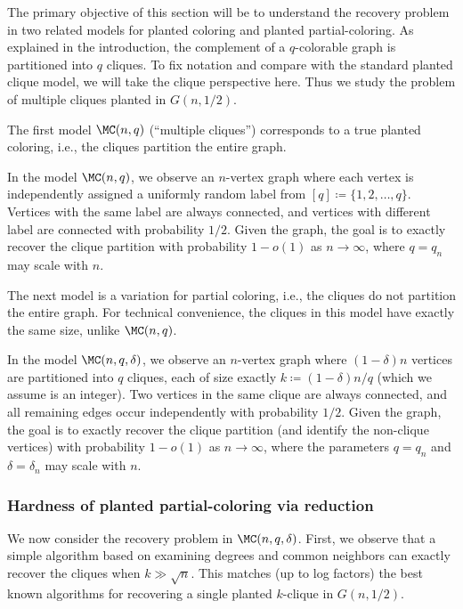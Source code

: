 \documentclass{article}
\begin{document}
The primary objective of this section will be to understand the recovery problem in two related models for planted coloring and planted partial-coloring. As explained in the introduction, the complement of a $q$-colorable graph is partitioned into $q$ cliques. To fix notation and compare with the standard planted clique model, we will take the clique perspective here. Thus we study the problem of multiple cliques planted in $G(n,1/2)$.

The first model $\MC(n,q)$ (``multiple cliques'') corresponds to a true planted coloring, i.e., the cliques partition the entire graph.

\begin{definition}\label{def:MC}
In the model $\MC(n,q)$, we observe an $n$-vertex graph where each vertex is independently assigned a uniformly random label from $[q] \coloneqq \{1,2,\ldots,q\}$. Vertices with the same label are always connected, and vertices with different label are connected with probability $1/2$. Given the graph, the goal is to exactly recover the clique partition with probability $1-o(1)$ as $n \to \infty$, where $q = q_n$ may scale with $n$.
\end{definition}

The next model is a variation for partial coloring, i.e., the cliques do not partition the entire graph. For technical convenience, the cliques in this model have exactly the same size, unlike $\MC(n,q)$.

\begin{definition}
In the model $\MC(n,q,\delta)$, we observe an $n$-vertex graph where $(1-\delta)n$ vertices are partitioned into $q$ cliques, each of size exactly $k \coloneqq (1-\delta)n/q$ (which we assume is an integer). Two vertices in the same clique are always connected, and all remaining edges occur independently with probability $1/2$. Given the graph, the goal is to exactly recover the clique partition (and identify the non-clique vertices) with probability $1-o(1)$ as $n \to \infty$, where the parameters $q = q_n$ and $\delta = \delta_n$ may scale with $n$.
\end{definition}



\subsubsection{Hardness of planted partial-coloring via reduction}
\label{sec:reduction}

We now consider the recovery problem in $\MC(n,q,\delta)$. First, we observe that a simple algorithm based on examining degrees and common neighbors can exactly recover the cliques when $k \gg \sqrt{n}$. This matches (up to log factors) the best known algorithms for recovering a single planted $k$-clique in $G(n,1/2)$.
\end{document}
